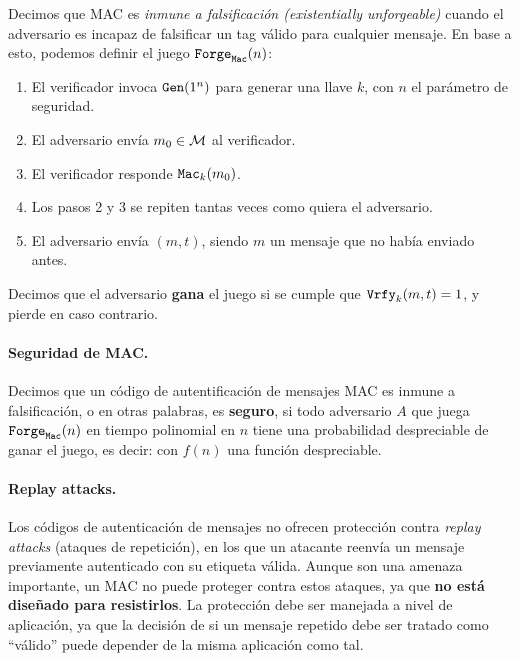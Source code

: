 Decimos que MAC es \textit{inmune a falsificación (existentially unforgeable)} cuando el adversario es incapaz de falsificar un tag válido para cualquier mensaje. En base a esto, podemos definir el juego $\texttt{Forge}_{\texttt{Mac}}(n)$:
\begin{enumerate}
    \item El verificador invoca $\texttt{Gen}(1^n)$ para generar una llave $k$, con $n$ el parámetro de seguridad.
    \item El adversario envía $m_0 \in \mathcal{M}$ al verificador.
    \item El verificador responde $\texttt{Mac}_k(m_0)$.
    \item Los pasos 2 y 3 se repiten tantas veces como quiera el adversario.
    \item El adversario envía $(m,t)$, siendo $m$ un mensaje que no había enviado antes.
\end{enumerate}
Decimos que el adversario \textbf{gana} el juego si se cumple que $\texttt{Vrfy}_k(m, t) = 1$, y pierde en caso contrario.

\paragraph{Seguridad de MAC.} Decimos que un código de autentificación de mensajes MAC es inmune a falsificación, o en otras palabras, es \textbf{seguro}, si todo adversario $A$ que juega $\texttt{Forge}_{\texttt{Mac}}(n)$ en tiempo polinomial en $n$ tiene una probabilidad despreciable de ganar el juego, es decir:
con $f(n)$ una función despreciable.
\paragraph{Replay attacks.} Los códigos de autenticación de mensajes no ofrecen protección contra \textit{replay attacks} (ataques de repetición), en los que un atacante reenvía un mensaje previamente autenticado con su etiqueta válida. Aunque son una amenaza importante, un MAC no puede proteger contra estos ataques, ya que \textbf{no está diseñado para resistirlos}. La protección debe ser manejada a nivel de aplicación, ya que la decisión de si un mensaje repetido debe ser tratado como ``válido'' puede depender de la misma aplicación como tal.
